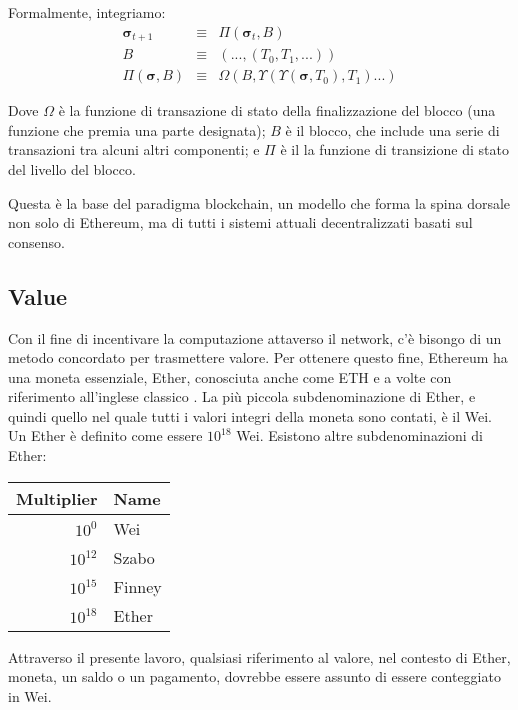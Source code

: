 \documentclass[9pt,oneside]{amsart}
\begin{document}
\begin{multicols}{2}
Formalmente, integriamo:
\begin{eqnarray}
\boldsymbol{\sigma}_{t+1} & \equiv & \Pi(\boldsymbol{\sigma}_t, B) \\
B & \equiv & (..., (T_0, T_1, ...) ) \\
\Pi(\boldsymbol{\sigma}, B) & \equiv & \Omega(B, \Upsilon(\Upsilon(\boldsymbol{\sigma}, T_0), T_1) ...)
\end{eqnarray}

Dove $\Omega$ è la funzione di transazione di stato della finalizzazione del blocco (una funzione che premia una parte designata); $B$ è il blocco, che include una serie di transazioni tra alcuni altri componenti; e $\Pi$ è il la funzione di transizione di stato del livello del blocco.

Questa è la base del paradigma blockchain, un modello che forma la spina dorsale non solo di Ethereum, ma di tutti i sistemi attuali decentralizzati basati sul consenso.

\subsection{Value}

Con il fine di incentivare la computazione attaverso il network, c'è bisongo di un metodo concordato per trasmettere valore. Per ottenere questo fine, Ethereum ha una moneta essenziale, Ether, conosciuta anche come {\small ETH} e a volte con riferimento all'inglese classico \DH{}. La più piccola subdenominazione di Ether, e quindi quello nel quale tutti i valori integri della moneta sono contati, è il Wei. Un Ether è definito come essere $10^{18}$ Wei. Esistono altre subdenominazioni di Ether:
\par
\begin{center}
\begin{tabular}{rl}
\toprule
Multiplier & Name \\
\midrule
$10^0$ & Wei \\
$10^{12}$ & Szabo \\
$10^{15}$ & Finney \\
$10^{18}$ & Ether \\
\bottomrule
\end{tabular}
\end{center}
\par

Attraverso il presente lavoro, qualsiasi riferimento al valore, nel contesto di Ether, moneta, un saldo o un pagamento, dovrebbe essere assunto di essere conteggiato in Wei.


\end{multicols}
\end{document}

